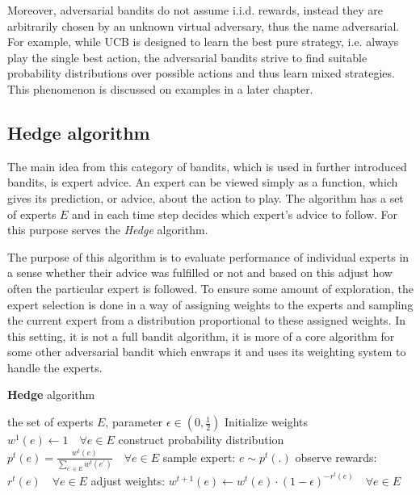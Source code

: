 \documentclass[../main.tex]{subfiles}
\begin{document}
Moreover, adversarial bandits do not assume i.i.d. rewards, instead they are arbitrarily chosen by an unknown virtual adversary, thus the name adversarial.
For example, while UCB is designed to learn the best pure strategy, i.e. always play the single best action, the adversarial bandits strive to find suitable probability distributions over possible actions and thus learn mixed strategies.
This phenomenon is discussed on examples in a later chapter.

\subsection{Hedge algorithm}\label{bandit:adversarial:hedge}
The main idea from this category of bandits, which is used in further introduced bandits, is expert advice.
An expert can be viewed simply as a function, which gives its prediction, or advice, about the action to play.
The algorithm has a set of experts $E$ and in each time step decides which expert's advice to follow.
For this purpose serves the \textit{Hedge} algorithm.

The purpose of this algorithm is to evaluate performance of individual experts in a sense whether their advice was fulfilled or not and based on this adjust how often the particular expert is followed.
To ensure some amount of exploration, the expert selection is done in a way of assigning weights to the experts and sampling the current expert from a distribution proportional to these assigned weights.
In this setting, it is not a full bandit algorithm, it is more of a core algorithm for some other adversarial bandit which enwraps it and uses its weighting system to handle the experts.

\begin{algorithm}
    \caption{\textbf{Hedge} algorithm}
    \label{bandit:adversarial:hedge:alg}
    \begin{algorithmic}[1]
        \Require the set of experts $E$, parameter $\epsilon \in \left(0, \frac{1}{2}\right)$
        \State Initialize weights $w^1(e) \leftarrow 1 \quad \forall e \in E$
            \State construct probability distribution $p^t(e) = \frac{w^t(e)}{\sum_{e^{\prime} \in E} w^t(e^{\prime})} \quad \forall e \in E$
            \State sample expert: $e \sim p^t\left(.\right)$
            \State observe rewards: $r^t(e) \quad \forall e \in E$
            \State adjust weights: $w^{t+1}(e) \leftarrow w^t(e) \cdot (1 - \epsilon)^{-r^t(e)} \quad \forall e \in E$
        \EndFor
    \end{algorithmic}
\end{algorithm}
\end{document}
